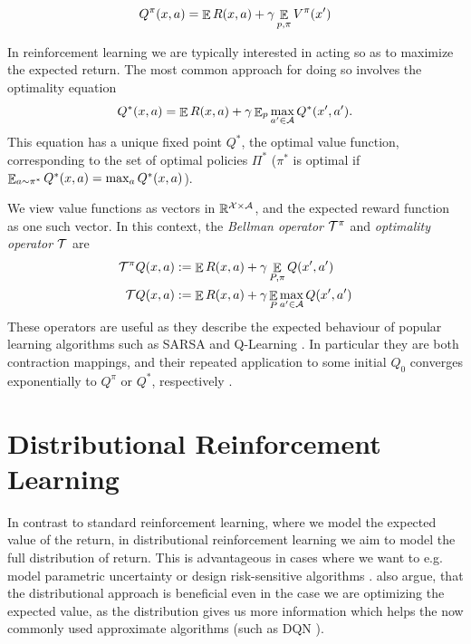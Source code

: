 \begin{equation}
Q^\pi(x, a) = \mathop{\mathbb{E}} R(x, a) + \gamma \mathop{\mathbb{E}}_{p, \pi}V^\pi(x')
\end{equation}

In reinforcement learning we are typically interested in acting so as to maximize the expected return. The most common approach for doing so involves the optimality equation
\begin{equation*}
Q^*(x,a) = \mathop{\mathbb{E}} R(x,a) + \gamma \mathop{\mathbb{E}}\nolimits_p \max_{a' \in \mathcal{A}} Q^*(x', a') .
\end{equation*}
This equation has a unique fixed point $Q^*$, the optimal value function, corresponding to the set of optimal policies $\Pi^*$ ($\pi^*$ is optimal if $\mathop{\mathbb{E}}_{a \sim \pi^*} Q^*(x, a) = \max_a Q^*(x,a)$).

We view value functions as vectors in $\mathbb{R}^{\mathcal{X} \times \mathcal{A}}$, and the expected reward function as one such vector. In this context, the \emph{Bellman operator} $\mathcal{T}^\pi$ and \emph{optimality operator} $\mathcal{T}$ are
\begin{align}
\mathcal{T}^\pi Q(x,a) &:= \mathop{\mathbb{E}} R(x,a) + \gamma \mathop{\mathbb{E}}_{P, \pi} Q(x',a')\\
\mathcal{T} Q(x,a) &:= \mathop{\mathbb{E}} R(x,a) + \gamma \mathop{\mathbb{E}}_{P} \max_{a' \in \mathcal{A}} Q(x', a')
\end{align}
These operators are useful as they describe the expected behaviour of popular learning algorithms such as SARSA and Q-Learning \cite{sutton1998reinforcement}. In particular they are both contraction mappings, and their repeated application to some initial $Q_0$ converges exponentially to $Q^\pi$ or $Q^*$, respectively \citep{bertsekas1995neuro}.




\section{Distributional Reinforcement Learning}\label{sec:prelim:distrl}

In contrast to standard reinforcement learning, where we model the expected value of the return, in distributional reinforcement learning \cite{many} we aim to model the full distribution of return. This is advantageous in cases where we want to e.g. model parametric uncertainty \cite{...} or design risk-sensitive algorithms \citep{morimura2012parametric}\citep{morimura2010nonparametric}. \citet{bellemare2017distributional} also argue, that the distributional approach is beneficial even in the case we are optimizing the expected value, as the distribution gives us more information which helps the now commonly used approximate algorithms (such as DQN \citep{mnih2015human}).

